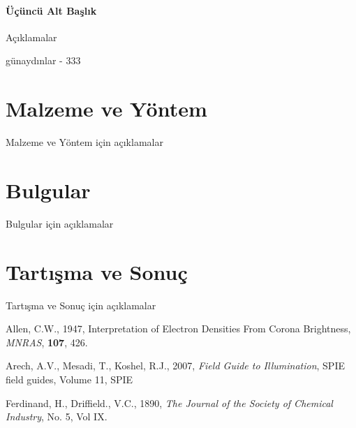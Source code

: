 \documentclass[12pt, oneside]{iufenbil}
\begin{document}
\paragraph{Üçüncü Alt Başlık}
	Açıklamalar
	
\begin{definition}
	günaydınlar - 333
\end{definition}

\section{Malzeme ve Yöntem}
	Malzeme ve Yöntem için açıklamalar

\section{Bulgular}
	Bulgular için açıklamalar
	
\section{Tartışma ve Sonuç}
	Tartışma ve Sonuç için açıklamalar
	

\begin{thebibliography}{}	

Allen, C.W., 1947, Interpretation of Electron Densities From Corona Brightness, {\it MNRAS}, \textbf{107}, 426.

Arech, A.V., Mesadi, T., Koshel, R.J., 2007, \textit{Field Guide to Illumination}, SPIE field guides, Volume 11, SPIE

Ferdinand, H., Driffield., V.C., 1890, \textit{The Journal of the Society of Chemical Industry}, No. 5, Vol IX.
		
\end{thebibliography}
\end{document}
